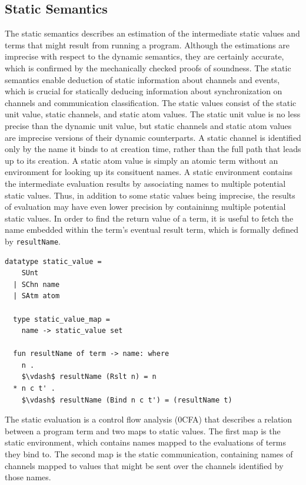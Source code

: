 \documentclass[letterpaper, 11pt]{extarticle}
\begin{document}
\subsection{Static Semantics}

The static semantics describes an estimation of the intermediate static values and terms
that might result from running a program. Although the estimations are imprecise with
respect to the dynamic semantics, they are certainly accurate,
which is confirmed by the mechanically checked proofs of soundness.
The static semantics enable deduction of static information about channels and events, which is
crucial for statically deducing information about synchronization on channels and
communication classification.
The static values consist of the static unit value, static channels, and static atom
values. The static unit value is no less precise than the dynamic unit value, but
static channels and static atom values are imprecise versions of their dynamic
counterparts. A static channel is identified only by the name it binds to at creation time,
rather than the full path that leads up to its creation. A static atom value is simply an
atomic term without an environment for looking up its consituent names. A static
environment contains the intermediate evaluation results by
associating names to multiple potential static values.
Thus, in addition to some static values being imprecise,
the results of evaluation may have even lower precision
by containinng multiple potential static values. 
In order to find the return value of a term, it is useful to fetch the name
embedded within the term's eventual result term, which is formally defined by \lstinline{resultName}.

\begin{lstlisting}[language=logic, mathescape]
  datatype static_value =
    SUnt
  | SChn name
  | SAtm atom 

  type static_value_map =
    name -> static_value set

  fun resultName of term -> name: where
    n .
    $\vdash$ resultName (Rslt n) = n
  * n c t' . 
    $\vdash$ resultName (Bind n c t') = (resultName t)
\end{lstlisting}

The static evaluation is a control flow analysis (0CFA)
that describes a relation between a program term and two maps to static values.
The first map is the static environment, which contains names mapped to the 
evaluations of terms they bind to.
The second map is the static communication, containing names of channels mapped to
values that might be sent over the channels identified by those names.
\end{document}
